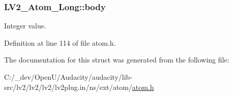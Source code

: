 \subsubsection[{\texorpdfstring{body}{body}}]{ L\+V2\+\_\+\+Atom\+\_\+\+Long\+::body}\hypertarget{struct_l_v2___atom___long_ad5e9317cb37db6804aab62580b182a94}{}\label{struct_l_v2___atom___long_ad5e9317cb37db6804aab62580b182a94}
Integer value. 

Definition at line 114 of file atom.\+h.



The documentation for this struct was generated from the following file\+:\begin{DoxyCompactItemize}
\item 
C\+:/\+\_\+dev/\+Open\+U/\+Audacity/audacity/lib-\/src/lv2/lv2/lv2/lv2plug.\+in/ns/ext/atom/\hyperlink{atom_8h}{atom.\+h}\end{DoxyCompactItemize}
